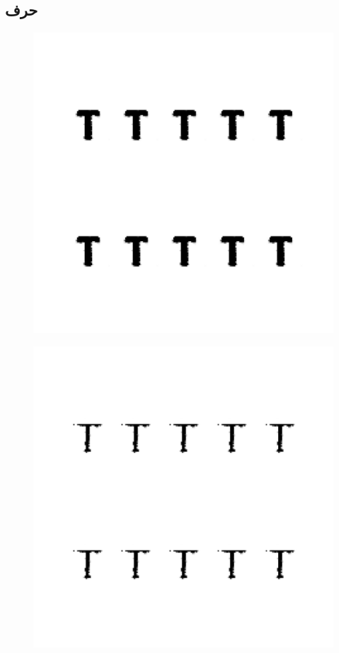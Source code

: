 \documentclass{article}
\begin{document}
\subsection{حرف }
\begin{figure}[H]
	\centerline{\includegraphics[width=\textwidth , height=\textheight ]{../results/CGAN_Adam/figs/letters/T/95.pdf}}
\end{figure}
\begin{figure}[H]
	\centerline{\includegraphics[width=\textwidth , height=\textheight ]{../results/CGAN_Adam/figs/letters/T/90.pdf}}
\end{figure}
\end{document}
